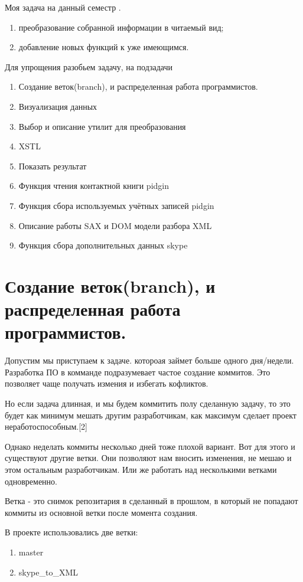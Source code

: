 \newpage
Моя задача на данный семестр . \\
\begin{enumerate}
\item преобразование собранной информации в читаемый вид;
\item добавление новых функций к уже имеющимся.
\end{enumerate}
Для упрощения разобьем задачу, на подзадачи
\begin{enumerate}
\item Создание веток(branch), и распределенная работа программистов. 
\item Визуализация данных
\item Выбор и описание утилит для преобразования
\item XSTL
\item Показать результат
\item Функция чтения контактной книги pidgin
\item Функция сбора используемых учётных записей pidgin
\item Описание работы SAX и DOM модели разбора XML
\item Функция сбора дополнительных данных skype
\end{enumerate}
\chapter*{Создание веток(branch), и распределенная работа программистов.}
Допустим мы приступаем к задаче. котороая займет больше одного дня/недели. Разработка ПО в комманде подразумевает частое создание коммитов. Это позволяет чаще получать измения и избегать кофликтов. 

Но если задача длинная, и мы будем коммитить полу сделанную задачу, то это будет как минимум мешать другим разработчикам, как максимум сделает проект неработоспособным.[2]

Однако неделать коммиты несколько дней тоже плохой вариант. Вот для этого и существуют другие ветки. Они позволяют нам вносить изменения, не мешаю и этом остальным разработчикам. Или же работать над несколькими ветками одновременно.

Ветка - это снимок репозитария в сделанный в прошлом, в который не попадают коммиты из основной ветки после момента создания.

В проекте использовались две ветки:
\begin{enumerate}
\item master
\item skype_to_XML
\end{enumerate}

